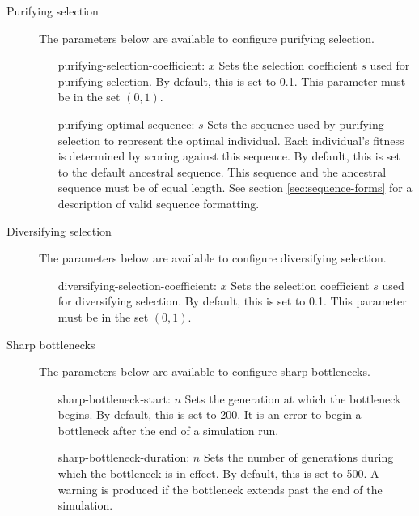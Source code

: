 \documentclass{article}
\begin{document}
        \begin{description}
          \item[Purifying selection] The parameters below are available to
	  configure purifying selection.

            \begin{enumerate}
              \item[purifying-selection-coefficient: $x$]
              Sets the selection coefficient $s$ used for purifying selection.
              By default, this is set to 0.1. This parameter must be in the set
              $(0, 1)$.

              \item[purifying-optimal-sequence: $s$]
              Sets the sequence used by purifying selection to represent the
              optimal individual. Each individual's fitness is determined by
              scoring against this sequence. By default, this is set to the
              default ancestral sequence. This sequence and the ancestral
              sequence must be of equal length. See section
	      \ref{sec:sequence-forms} for a description of valid sequence
	      formatting.
            \end{enumerate}

	  \item[Diversifying selection] The parameters below are available to
	  configure diversifying selection.

	    \begin{enumerate}
	      \item[diversifying-selection-coefficient: $x$]
	      Sets the selection coefficient $s$ used for diversifying
	      selection. By default, this is set to 0.1. This parameter must be
	      in the set $(0, 1)$.
	    \end{enumerate}

          \item[Sharp bottlenecks] The parameters below are available to
	  configure sharp bottlenecks.

            \begin{enumerate}
              \item[sharp-bottleneck-start: $n$]
              Sets the generation at which the bottleneck begins. By default,
              this is set to 200. It is an error to begin a bottleneck after the
              end of a simulation run.

              \item[sharp-bottleneck-duration: $n$]
              Sets the number of generations during which the bottleneck is in
              effect. By default, this is set to 500. A warning is produced if
              the bottleneck extends past the end of the simulation.


\end{enumerate}
\end{description}
\end{document}
